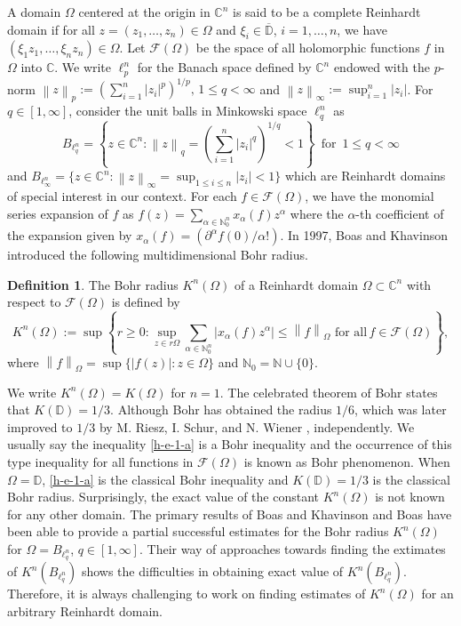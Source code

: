 \documentclass[a4paper,12pt]{amsart}
\theoremstyle{definition}
\newtheorem{defn}{Definition}[section]
\newcounter {own}
\newcommand{\norm}[1]{\left\lVert#1\right\rVert}
\begin{document}
A domain $\Omega$ centered at the origin in $\mathbb{C}^n$ is said to be a complete Reinhardt domain if for all $z=(z_{1},\ldots,z_{n}) \in \Omega$ and $\xi_{i} \in \overline{\mathbb{D}}$, $i=1, \ldots,n$, we have $(\xi_{1}z_{1},\ldots,\xi_{n}z_{n}) \in \Omega$. Let $\mathcal{F}(\Omega)$ be the space of all holomorphic functions $f$ in $\Omega$ into $\mathbb{C}$. We write $\ell^n_{p}$ for the Banach space defined by $\mathbb{C}^n$ endowed with the $p$-norm $\norm{z}_{p}:= \left(\sum_{i=1}^{n}|z_{i}|^p\right)^{1/p},\, 1\leq q<\infty$ and $\norm{z}_{\infty}:=\sup^n_{i=1}|z_i|$. For $q \in [1,\infty]$, consider the unit balls in Minkowski space $\ell^n_{q}$ as
$$B_{\ell^n _q}= \left\{z \in \mathbb{C}^n:\norm{z}_{q}=\left(\sum_{i=1}^{n}|z_{i}|^q\right)^{1/q}<1\right\}\,\,\, \mbox{for}\,\,\,1\leq q<\infty$$ 
and $B_{\ell^n _\infty}= \{z \in \mathbb{C}^n: \norm{z}_{\infty}=\sup _{1\leq i \leq n} |z_{i}|<1\}$ which are Reinhardt domains of special interest in our context. For each $f\in \mathcal{F}(\Omega)$, we have the monomial series expansion of $f$ as $f(z)=\sum_{\alpha\in \mathbb{N}^n_{0}}x_{\alpha}(f)z^{\alpha}$ where the $\alpha$-th coefficient of the expansion given by  $x_{\alpha}(f)=(\partial^{\alpha}f(0)/\alpha!)$.
In 1997, Boas and Khavinson \cite{boas-1997} introduced the following multidimensional Bohr radius.

\begin{defn}
	The Bohr radius $K^n(\Omega)$ of a Reinhardt domain $\Omega\subset \mathbb{C}^n$  with respect to $\mathcal{F}(\Omega)$ is defined by
	\begin{equation} \label{h-e-1-a}
	K^n(\Omega):=\sup\left\{r\geq 0: \sup_{z\in r\Omega}\sum_{\alpha\in \mathbb{N}^n_{0}} \left|x_{\alpha}(f) z^{\alpha}\right| \leq  \norm{f}_{\Omega}\,\, \mbox{for all}\, f\in \mathcal{F}(\Omega)\right\},
	\end{equation}
where $\norm{f}_{\Omega}=\sup \{|f(z)|: z \in \Omega\}$ and $\mathbb{N}_0=\mathbb{N}\cup\{0\}$.
\end{defn}
\noindent
 We write $K^n(\Omega)=K(\Omega)$ for $n=1$. The celebrated theorem of Bohr \cite{Bohr-1914} states that $K(\mathbb{D})=1/3$. Although Bohr has obtained the radius $1/6$, which was later improved to $1/3$ by M. Riesz, I. Schur, and N. Wiener \cite{sidon-1927,tomic-1962}, independently. We usually say the inequality \eqref{h-e-1-a} is a Bohr inequality and the occurrence of this type inequality for all functions in $\mathcal{F}(\Omega)$ is known as Bohr phenomenon. When $\Omega=\mathbb{D}$, \eqref{h-e-1-a} is the classical Bohr inequality and $K(\mathbb{D})=1/3$ is the classical Bohr radius. Surprisingly, the exact value of the constant $K^n(\Omega)$ is not known for any other domain. The primary results of Boas and Khavinson \cite{boas-1997} and Boas \cite{boas-2000} have been able to provide a partial successful estimates for the Bohr radius $K^n(\Omega)$ for $\Omega=B_{\ell^n _q}$, $q \in [1,\infty]$. Their way of approaches towards finding the extimates of $K^n(B_{\ell^n _q})$ shows the difficulties in obtaining exact value of $K^n(B_{\ell^n _q})$. Therefore, it is always challenging to work on finding estimates of $K^n(\Omega)$ for an arbitrary Reinhardt domain. 
\vspace{1mm}
\end{document}
